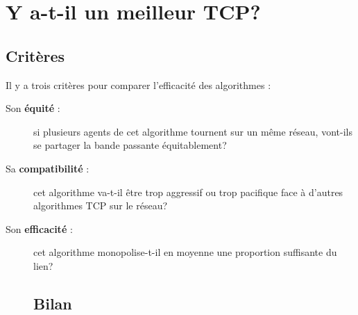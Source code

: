\documentclass[	DIV=calc,%
							paper=a4,%
							fontsize=11pt,%
							twocolumn]{scrartcl}	 					%
\begin{document}
\section*{Y a-t-il un meilleur TCP?}
\subsection*{Critères}
Il y a trois critères pour comparer l'efficacité des algorithmes :
\begin{description}
\item[Son \textbf{équité} :]{si plusieurs agents de cet algorithme tournent sur un même réseau, vont-ils se partager la bande passante équitablement?}
\item[Sa \textbf{compatibilité} :]{cet algorithme va-t-il être trop aggressif ou trop pacifique face à d'autres algorithmes TCP sur le réseau?}
\item[Son \textbf{efficacité} :]{cet algorithme monopolise-t-il en moyenne une proportion suffisante du lien?} 	
\subsection*{Bilan}
\end{description}
\end{document}
